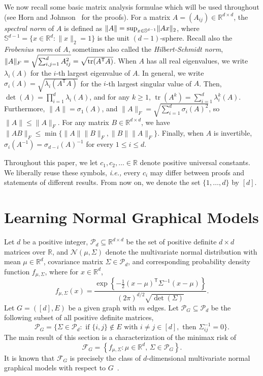 \documentclass[letterpaper]{amsart}
\makeatletter
\DeclarePairedDelimiter{\norm}{\lVert}{\rVert}
\newcommand{\bS}{\mathbb{S}}
\newcommand{\sP}{\mathcal{P}}
\newcommand{\sF}{\mathcal{F}}
\newcommand{\sN}{\mathcal{N}}
\newcommand{\R}{\mathbb{R}}
\DeclareMathOperator{\tr}{tr}
\let\originalleft\left
\let\originalright\right
\def\left#1{\mathopen{}\originalleft#1}
\def\right#1{\originalright#1\mathclose{}}
\newcommand*{\ie}{\emph{i.e.,}\@\xspace}
\newcommand{\seclabel}[1]{\label{sec:#1}}
\numberwithin{thm}{section}
\theoremstyle{definition}
\theoremstyle{plain}
\newcommand{\transpose}{^{\mathsf{T}}}
\makeatother
\begin{document}
We now recall some basic matrix analysis formulae which will be used
throughout (see Horn and Johnson~\cite{matrix_analysis} for the
proofs).  For a matrix $A = (A_{ij}) \in \R^{d \times d}$, the
\emph{spectral norm} of $A$ is defined as
$\norm{A} = \sup_{x \in \bS^{d - 1}} \norm{A x}_2$, where
$\bS^{d - 1} = \{ x \in \R^d \colon \|x\|_2 = 1\}$ is the unit
$(d - 1)$-sphere. Recall also the \emph{Frobenius norm} of $A$,
sometimes also called the \emph{Hilbert-Schmidt norm},
$\norm{A}_F = \sqrt{ \sum_{i,j = 1}^d A_{i j}^2} =
\sqrt{\tr(A\transpose A)}$. When $A$ has all real eigenvalues, we
write $\lambda_i(A)$ for the $i$-th largest eigenvalue of $A$. In
general, we write $\sigma_i(A) = \sqrt{\lambda_i(A\transpose A)}$ for
the $i$-th largest singular value of $A$. Then,
$\det(A) = \prod_{i = 1}^d \lambda_i(A)$, and for any $k \ge 1$,
$\tr(A^k) = \sum_{i = 1}^d \lambda_i^k(A)$. Furthermore,
$\|A\| = \sigma_1(A)$, and
$\|A\|_F = \sqrt{\sum_{i = 1}^d \sigma_i(A)^2}$, so
$\|A\| \le \|A\|_F$. For any matrix $B \in \R^{d \times d}$, we have
$\|A B\|_F \le \min\{\|A\| \|B\|_F, \|B\| \|A\|_F\}$. Finally, when
$A$ is invertible, $\sigma_i(A^{-1}) = \sigma_{d - i}(A)^{-1}$ for
every $1 \le i \le d$.

Throughout this paper, we let $c_1, c_2, \ldots \in \R$ denote
positive universal constants. We liberally reuse these symbols, \ie
every $c_i$ may differ between proofs and statements of different
results.  From now on, we denote the set $\{1,\dots,d\}$ by $[d]$.


\section{Learning Normal Graphical Models}\seclabel{normal}
Let $d$ be a positive integer, $\sP_d \subseteq \R^{d \times d}$ be
the set of positive definite $d \times d$ matrices over $\R$, and
$\sN(\mu, \Sigma)$ denote the multivariate normal distribution with
mean $\mu \in \R^d$, covariance matrix $\Sigma \in \sP_d$, and
corresponding probability density function $f_{\mu, \Sigma}$, where
for $x \in \R^d$,
\[
  f_{\mu, \Sigma}(x) = \frac{\exp\left\{ - \frac{1}{2} (x - \mu)\transpose \Sigma^{-1} (x - \mu) \right\} }{(2 \pi)^{d/2} \sqrt{\det(\Sigma)}} .
\]
Let $G = ([d], E)$ be a given graph with $m$ edges. Let
$\sP_G \subseteq \sP_d$ be the following subset of all positive
definite matrices,
\[
  \sP_G = \Big\{ \Sigma \in \sP_d \colon \text{ if } \{i, j\} \not\in E \text{ with } i \neq j \in [d], \text{ then } \Sigma^{-1}_{ij} = 0 \Big\} .
\]
The main result of this section is a characterization of the minimax
risk of
\[
  \sF_G = \left\{ f_{\mu, \Sigma} \colon \mu \in \R^d , \, \Sigma \in \sP_G \right\} .
\]
It is known that $\sF_G$ is precisely the class of $d$-dimensional
multivariate normal graphical models with respect to
$G$~\cite[Proposition~5.2]{graphical-models}.
\end{document}

